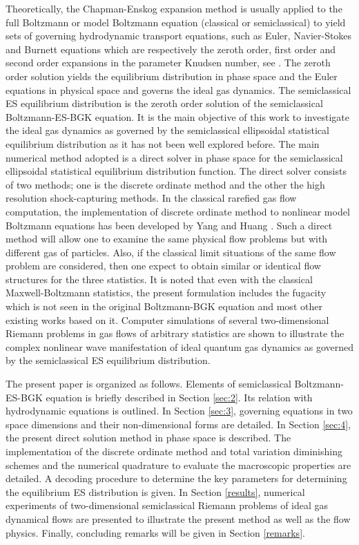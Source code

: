 \documentclass{rsproca}%
\begin{document}
Theoretically, the Chapman-Enskog expansion method is usually applied to the full Boltzmann or model Boltzmann equation (classical or semiclassical) to yield sets of governing hydrodynamic transport equations, such as Euler, Navier-Stokes and Burnett equations which are respectively the zeroth order, first order and second order expansions in the parameter Knudsen number,  see \cite{Cowling1970}.   The zeroth order solution yields the equilibrium distribution in phase space and the Euler equations in physical space and governs the ideal gas dynamics.  The semiclassical ES equilibrium distribution is the zeroth order solution of the semiclassical Boltzmann-ES-BGK equation.  It is the main objective of this work to investigate the ideal gas dynamics as governed by the semiclassical ellipsoidal statistical equilibrium distribution as it has not been well explored before.   The main numerical method adopted is a direct solver in phase space for the semiclassical ellipsoidal statistical equilibrium distribution function.  The direct solver consists of two methods; one is the discrete ordinate method and the other the high resolution shock-capturing methods.   In the classical rarefied gas flow computation, the implementation of discrete ordinate method to nonlinear model Boltzmann equations has been developed by Yang and Huang \cite{Yang1995323}.  Such a direct method will allow one to examine the same physical flow problems but with different gas of particles.   Also, if the classical limit situations of the same flow problem are considered, then one expect to obtain similar or identical flow structures for the three statistics.   It is noted that even with the classical Maxwell-Boltzmann statistics, the present formulation includes the fugacity which is not seen in the original Boltzmann-BGK equation \cite{PhysRev.94.511} and most other existing works based on it.  Computer simulations of several two-dimensional Riemann problems in gas flows of arbitrary statistics are shown to illustrate the complex nonlinear wave manifestation of ideal quantum gas dynamics as governed by the semiclassical ES equilibrium distribution.


The present paper is organized as follows.  Elements of semiclassical Boltzmann-ES-BGK equation is briefly described in Section \ref{sec:2}. Its relation with hydrodynamic equations is outlined. In Section \ref{sec:3}, governing equations in two space dimensions and their non-dimensional forms are detailed. In Section \ref{sec:4}, the present direct solution method in phase space is described.   The implementation of the discrete ordinate method and total variation diminishing schemes and the numerical quadrature to evaluate the macroscopic properties are detailed.   A decoding procedure to determine the key parameters for determining the equilibrium ES distribution is given.  In Section \ref{results}, numerical experiments of two-dimensional semiclassical Riemann problems of ideal gas dynamical flows are presented to illustrate the present method as well as the flow physics. Finally, concluding remarks will be given in Section \ref{remarks}.
\end{document}
